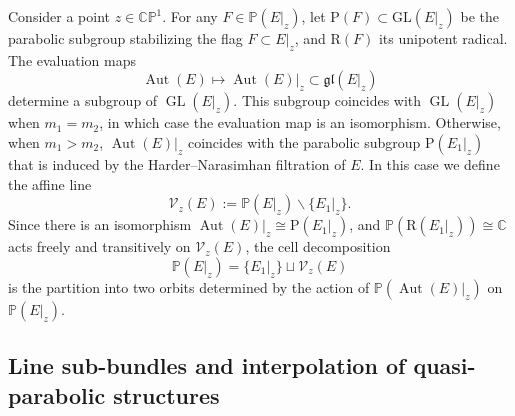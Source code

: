 \documentclass[10pt,a4paper]{amsart}
\newcommand{\field}[1]{\ensuremath{\mathbb{#1}}}
\newcommand{\CC}{\field{C}}
\newcommand{\PP}{\field{P}}
\newcommand{\curly}[1]{\mathscr{#1}}
\newcommand{\cV}{\curly{V}}
\DeclareMathOperator{\Aut}{Aut}
\DeclareMathOperator{\GL}{GL}
\numberwithin{equation}{section}
\begin{document}
Consider a point $z\in\CC\PP^{1}$. For any $F\in\PP(E\vert_{z})$, let $\mathrm{P}(F)\subset\mathrm{GL}(E\vert_{z})$ be the parabolic subgroup stabilizing the flag $F\subset E\vert_{z}$, and $\mathrm{R}(F)$ its unipotent radical. The evaluation maps
\[
\Aut(E)\mapsto \Aut(E)\vert_{z}\subset \mathfrak{gl}(E\vert_{z})
\]
determine a subgroup of $\GL(E|_{z})$. This subgroup coincides with $\GL(E\vert_{z})$ when $m_{1} = m_{2}$, in which case the evaluation map is an isomorphism. Otherwise, when $m_{1} > m_{2}$, $\Aut(E)\vert_{z}$ coincides with the parabolic subgroup $\mathrm{P}(E_{1}\vert_{z})$ that is induced by the Harder--Narasimhan filtration of $E$.
In this case we define the affine line
\[
\cV_{z}(E) := \PP(E\vert_{z})\backslash\{E_{1}\vert_{z}\}.
\]
Since there is an isomorphism
$\Aut(E)|_{z} \cong \mathrm{P}(E_{1}\vert_{z})$,
and $\PP(\mathrm{R}(E_{1}\vert_{z}))\cong \CC$ acts freely and transitively on $\cV_{z}(E)$, the cell decomposition
\[
\PP(E\vert_{z}) = \{E_{1}\vert_{z}\}\sqcup\cV_{z}(E)
\]
is the partition into two orbits determined by the action of $\PP(\Aut(E)|_{z})$ on $\PP(E|_{z})$.

\subsection{Line sub-bundles and interpolation of quasi-parabolic structures}
\end{document}
